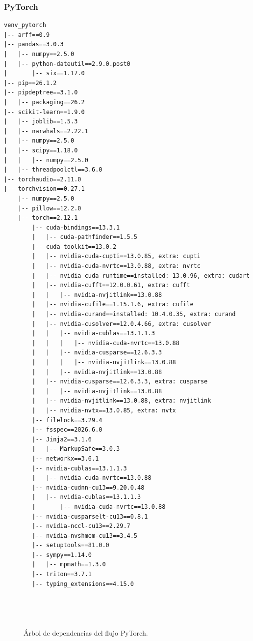 \documentclass[a4paper,12pt,twoside,final]{book}
\begin{document}
\subsubsection{PyTorch}
\begin{verbatim}
venv_pytorch
|-- arff==0.9
|-- pandas==3.0.3
|   |-- numpy==2.5.0
|   |-- python-dateutil==2.9.0.post0
|       |-- six==1.17.0
|-- pip==26.1.2
|-- pipdeptree==3.1.0
|   |-- packaging==26.2
|-- scikit-learn==1.9.0
|   |-- joblib==1.5.3
|   |-- narwhals==2.22.1
|   |-- numpy==2.5.0
|   |-- scipy==1.18.0
|   |   |-- numpy==2.5.0
|   |-- threadpoolctl==3.6.0
|-- torchaudio==2.11.0
|-- torchvision==0.27.1
    |-- numpy==2.5.0
    |-- pillow==12.2.0
    |-- torch==2.12.1
        |-- cuda-bindings==13.3.1
        |   |-- cuda-pathfinder==1.5.5
        |-- cuda-toolkit==13.0.2
        |   |-- nvidia-cuda-cupti==13.0.85, extra: cupti
        |   |-- nvidia-cuda-nvrtc==13.0.88, extra: nvrtc
        |   |-- nvidia-cuda-runtime==installed: 13.0.96, extra: cudart
        |   |-- nvidia-cufft==12.0.0.61, extra: cufft
        |   |   |-- nvidia-nvjitlink==13.0.88
        |   |-- nvidia-cufile==1.15.1.6, extra: cufile
        |   |-- nvidia-curand==installed: 10.4.0.35, extra: curand
        |   |-- nvidia-cusolver==12.0.4.66, extra: cusolver
        |   |   |-- nvidia-cublas==13.1.1.3
        |   |   |   |-- nvidia-cuda-nvrtc==13.0.88
        |   |   |-- nvidia-cusparse==12.6.3.3
        |   |   |   |-- nvidia-nvjitlink==13.0.88
        |   |   |-- nvidia-nvjitlink==13.0.88
        |   |-- nvidia-cusparse==12.6.3.3, extra: cusparse
        |   |   |-- nvidia-nvjitlink==13.0.88
        |   |-- nvidia-nvjitlink==13.0.88, extra: nvjitlink
        |   |-- nvidia-nvtx==13.0.85, extra: nvtx
        |-- filelock==3.29.4
        |-- fsspec==2026.6.0
        |-- Jinja2==3.1.6
        |   |-- MarkupSafe==3.0.3
        |-- networkx==3.6.1
        |-- nvidia-cublas==13.1.1.3
        |   |-- nvidia-cuda-nvrtc==13.0.88
        |-- nvidia-cudnn-cu13==9.20.0.48
        |   |-- nvidia-cublas==13.1.1.3
        |       |-- nvidia-cuda-nvrtc==13.0.88
        |-- nvidia-cusparselt-cu13==0.8.1
        |-- nvidia-nccl-cu13==2.29.7
        |-- nvidia-nvshmem-cu13==3.4.5
        |-- setuptools==81.0.0
        |-- sympy==1.14.0
        |   |-- mpmath==1.3.0
        |-- triton==3.7.1
        |-- typing_extensions==4.15.0
\end{verbatim}
\vspace{-2em}
\begin{figure}[ht]
  \centering
  \caption{Árbol de dependencias del flujo PyTorch.}
  \label{fig:dependencias_pytorch}
\end{figure}
\end{document}
